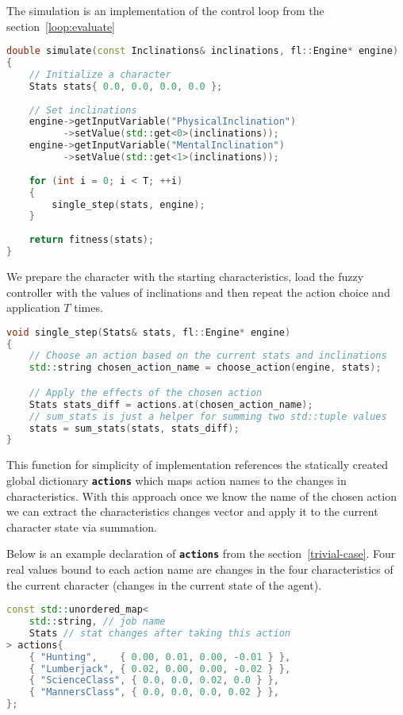 \documentclass[12pt, a4paper]{report}
\begin{document}
	The simulation is an implementation of the control loop from the section~\ref{loop:evaluate}
	
	\begin{lstlisting}[language=c++]
double simulate(const Inclinations& inclinations, fl::Engine* engine)
{
	// Initialize a character
	Stats stats{ 0.0, 0.0, 0.0, 0.0 };
	
	// Set inclinations
	engine->getInputVariable("PhysicalInclination")
		  ->setValue(std::get<0>(inclinations));
	engine->getInputVariable("MentalInclination")
	      ->setValue(std::get<1>(inclinations));
	
	for (int i = 0; i < T; ++i)
	{
		single_step(stats, engine);
	}
	
	return fitness(stats);
}
	\end{lstlisting}
	
	We prepare the character with the starting characteristics, load the fuzzy controller with the values of inclinations and then repeat the action choice and application $T$ times.
	
	\begin{lstlisting}[language=c++]
void single_step(Stats& stats, fl::Engine* engine)
{
	// Choose an action based on the current stats and inclinations
	std::string chosen_action_name = choose_action(engine, stats);

	// Apply the effects of the chosen action
	Stats stats_diff = actions.at(chosen_action_name);
	// sum_stats is just a helper for summing two std::tuple values
	stats = sum_stats(stats, stats_diff);
}
	\end{lstlisting}
	
	This function for simplicity of implementation references the statically created global dictionary \textbf{\texttt{actions}} which maps action names to the changes in characteristics.
	With this approach once we know the name of the chosen action we can extract the characteristics changes vector and apply it to the current character state via summation.
	
	Below is an example declaration of \textbf{\texttt{actions}} from the section~\ref{trivial-case}.
	Four real values bound to each action name are changes in the four characteristics of the current character (changes in the current state of the agent).
	
	\begin{lstlisting}[language=c++]
const std::unordered_map<
	std::string, // job name
	Stats // stat changes after taking this action
> actions{
	{ "Hunting",    { 0.00, 0.01, 0.00, -0.01 } },
	{ "Lumberjack", { 0.02, 0.00, 0.00, -0.02 } },
	{ "ScienceClass", { 0.0, 0.0, 0.02, 0.0 } },
	{ "MannersClass", { 0.0, 0.0, 0.0, 0.02 } },
};	
	\end{lstlisting}
	
\end{document}
